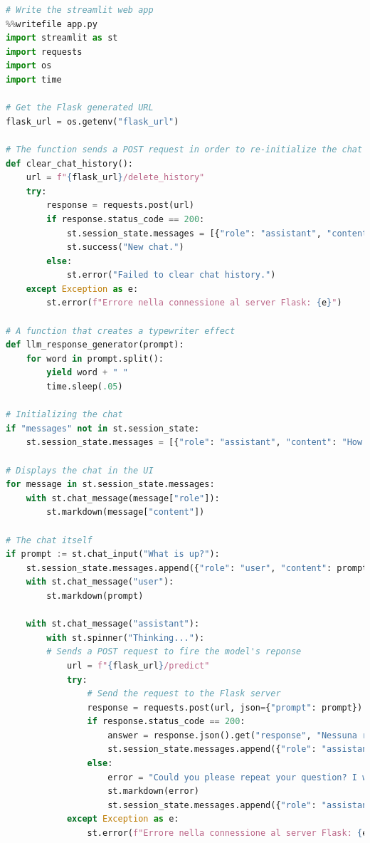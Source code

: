 \begin{center}
\begin{lstlisting}[language=Python, frame=single, caption=Flask API Internal Service]
# Write the streamlit web app
%%writefile app.py
import streamlit as st
import requests
import os
import time

# Get the Flask generated URL
flask_url = os.getenv("flask_url")

# The function sends a POST request in order to re-initialize the chat
def clear_chat_history():
    url = f"{flask_url}/delete_history"
    try:
        response = requests.post(url)
        if response.status_code == 200:
            st.session_state.messages = [{"role": "assistant", "content": "How may I assist you today?"}]
            st.success("New chat.")
        else:
            st.error("Failed to clear chat history.")
    except Exception as e:
        st.error(f"Errore nella connessione al server Flask: {e}")
    
# A function that creates a typewriter effect
def llm_response_generator(prompt):
    for word in prompt.split():
        yield word + " "
        time.sleep(.05)
    
# Initializing the chat
if "messages" not in st.session_state:
    st.session_state.messages = [{"role": "assistant", "content": "How may I assist you today?"}]

# Displays the chat in the UI
for message in st.session_state.messages:
    with st.chat_message(message["role"]):
        st.markdown(message["content"])

# The chat itself
if prompt := st.chat_input("What is up?"):
    st.session_state.messages.append({"role": "user", "content": prompt})
    with st.chat_message("user"):
        st.markdown(prompt)
   
    with st.chat_message("assistant"):
        with st.spinner("Thinking..."):
        # Sends a POST request to fire the model's reponse
            url = f"{flask_url}/predict"
            try:
                # Send the request to the Flask server
                response = requests.post(url, json={"prompt": prompt})
                if response.status_code == 200:
                    answer = response.json().get("response", "Nessuna risposta ricevuta")
                    st.session_state.messages.append({"role": "assistant", "content": answer})
                else:
                    error = "Could you please repeat your question? I want to make sure I provide you with the best possible answer."
                    st.markdown(error)
                    st.session_state.messages.append({"role": "assistant", "content": error})
            except Exception as e:
                st.error(f"Errore nella connessione al server Flask: {e}")
        

\end{lstlisting}
\end{center}
